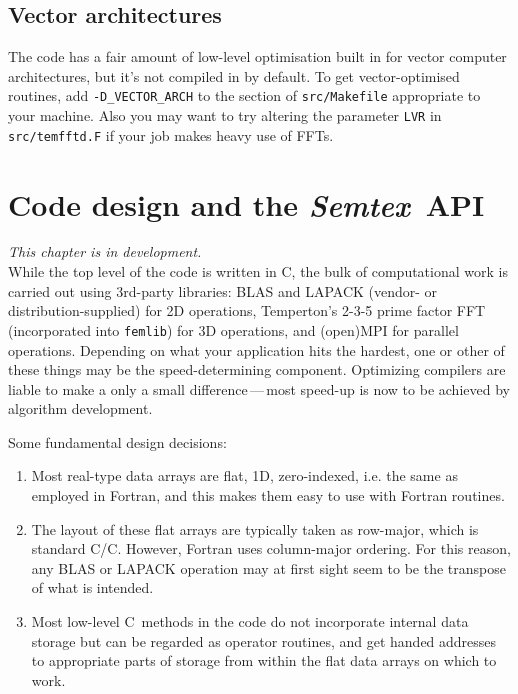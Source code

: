 \documentclass[11pt]{report}
\newcommand{\Semtex}{\emph{Semtex}} \newcommand{\Dog}{\emph{Dog}}
\newcommand\cpp{C\nolinebreak\hspace{-.05em}\raisebox{.3ex}{\footnotesize\bf
+}\nolinebreak\hspace{-.10em}\raisebox{.3ex}{\footnotesize\bf+}}
\begin{document}
\section{Vector architectures}
\label{sec.vector}

The code has a fair amount of low-level optimisation built in for
vector computer architectures, but it's not compiled in by default. To
get vector-optimised routines, add \verb+-D_VECTOR_ARCH+ to the
section of \texttt{src/Makefile} appropriate to your machine. Also you
may want to try altering the parameter \texttt{LVR} in
\texttt{src/temfftd.F} if your job makes heavy use of FFTs.



\chapter{Code design and the \Semtex\ API}
\label{sec.api}

\textsl{This chapter is in development.}\\


While the top level of the code is written in \cpp, the bulk of
computational work is carried out using 3rd-party libraries: BLAS and
LAPACK (vendor- or distribution-supplied) for 2D operations,
Temperton's 2-3-5 prime factor FFT (incorporated into \texttt{femlib})
for 3D operations, and (open)MPI for parallel operations.  Depending
on what your application hits the hardest, one or other of these
things may be the speed-determining component. Optimizing compilers
are liable to make a only a small difference\,---\,most speed-up is
now to be achieved by algorithm development.

Some fundamental design decisions:
\begin{enumerate}
\item
Most real-type data arrays are flat, 1D, zero-indexed, i.e. the same
as employed in Fortran, and this makes them easy to use with Fortran
routines.
\item
The layout of these flat arrays are typically taken as row-major,
which is standard C/\cpp. However, Fortran uses column-major
ordering. For this reason, any BLAS or LAPACK operation may at first
sight seem to be the transpose of what is intended.
\item
Most low-level \cpp\ methods in the code do not incorporate internal
data storage but can be regarded as operator routines, and get handed
addresses to appropriate parts of storage from within the flat data
arrays on which to work.
\end{enumerate}
\end{document}

